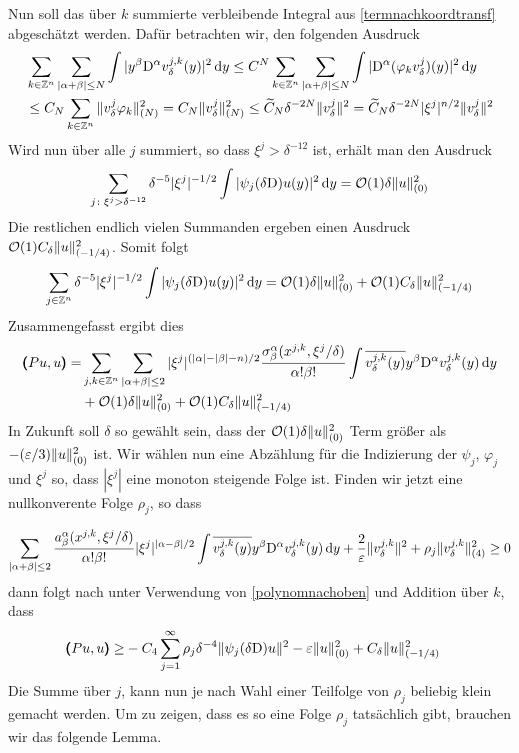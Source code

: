 Nun soll das über $k$ summierte verbleibende Integral aus \eqref{termnachkoordtransf} abgeschätzt werden. Dafür betrachten wir, den folgenden Ausdruck
\begin{align}
\begin{split}
&\sum_{k\in\mathbb Z^n}\sum_{|\alpha+\beta|\le N} \int|y^\beta\mathrm D^\alpha v^{j,k}_\delta(y)|^2\,\mathrm d y \le C^{N} \sum_{k\in\mathbb Z^n} \sum_{|\alpha+\beta|\le N}\int |\mathrm D^\alpha(\varphi_k v^j_\delta)(y)|^2\,\mathrm d y \\
&\le C_N\sum_{k\in\mathbb Z^n}\| v^j_\delta \varphi_k\|_{(N)}^2 
= C_N\| v^j_\delta \|_{(N)}^2 \nonumber
\le \widetilde C_N \delta^{-2N}\| v^j_\delta \|^2 = \widetilde C_N \delta^{-2N}|\xi^j|^{n/2}\| v^j_\delta \|^2 \label{polynomnachoben}
\end{split}
\end{align}
Wird nun über alle $j$ summiert, so dass $\xi^j>\delta^{-12}$ ist, erhält man den Ausdruck
\begin{align}
\sum_{j\colon \xi^j>\delta^{-12}} \delta^{-5} |\xi^j|^{-1/2}\int |\psi_j(\delta\mathrm D)u(y)|^2\,\mathrm d y = \mathcal O(1)\delta\lVert u\rVert _{(0)}^2
\end{align}
Die restlichen endlich vielen Summanden ergeben einen Ausdruck $\mathcal O(1)C_\delta \lVert u\rVert _{(-1/4)}^2$. Somit folgt
\begin{align}
\sum_{j\in\mathbb Z^n}\delta^{-5} |\xi^j|^{-1/2}\int |\psi_j(\delta\mathrm D)u(y)|^2\,\mathrm d y = \mathcal O(1)\delta\lVert u\rVert _{(0)}^2 + \mathcal O(1)C_\delta \lVert u\rVert _{(-1/4)}^2
\end{align}
Zusammengefasst ergibt dies
\begin{align}
\pmb(Pu,u\pmb)
=& \sum_{j,k\in\mathbb Z^n}\sum_{\lvert\alpha+\beta\rvert\le 2}|\xi^j|^{(\lvert\alpha\rvert-\lvert\beta\rvert-n)/2} \frac{\sigma^\alpha_\beta(x^{j,k},\xi^j/\delta)}{\alpha!\beta!}\int\overline{v^{j,k}_\delta(y)}y^\beta\mathrm D^\alpha v^{j,k}_\delta(y)\,\mathrm d y\\
&+\mathcal O(1)\delta\lVert u\rVert _{(0)}^2 + \mathcal O(1)C_\delta \lVert u\rVert _{(-1/4)}^2\nonumber
\end{align}
In Zukunft soll $\delta$ so gewählt sein, dass der $\mathcal O(1)\delta\lVert u\rVert ^2_{(0)}$ Term größer als $-(\varepsilon/3)\lVert u\rVert ^2_{(0)}$ ist. Wir wählen nun eine Abzählung für die Indizierung der $\psi_j$, $\varphi_j$ und $\xi^j$ so, dass $|\xi^j|$ eine monoton steigende Folge ist. Finden wir jetzt eine nullkonverente Folge $\rho_j$, so dass

\begin{align}
\sum_{|\alpha+\beta|\le 2} \frac{a^\alpha_\beta(x^{j,k},\xi^j/\delta)}{\alpha!\beta!}|\xi^j|^{|\alpha-\beta|/2}\int \overline{v^{j,k}_\delta(y)}y^\beta\mathrm D^\alpha v^{j,k}_\delta(y)\,\mathrm d y + \frac{2}{\varepsilon}\lVert v^{j,k}_\delta\rVert^2 + \rho_j \lVert v^{j,k}_\delta\rVert_{(4)}^2 \ge 0
\end{align}
dann folgt nach unter Verwendung von \eqref{polynomnachoben} und Addition über $k$,  dass 
\begin{align}
\pmb(Pu,u\pmb)
\ge& -C_4\sum_{j=1}^\infty \rho_j \delta^{-4}\lVert\psi_j(\delta\mathrm D)u\rVert^2 - \varepsilon \lVert u\rVert _{(0)}^2 + C_\delta \lVert u\rVert _{(-1/4)}^2\nonumber
\end{align}
Die Summe über $j$, kann nun je nach Wahl einer Teilfolge von $\rho_j$ beliebig klein gemacht werden. Um zu zeigen, dass es so eine Folge $\rho_j$ tatsächlich gibt, brauchen wir das folgende Lemma.

